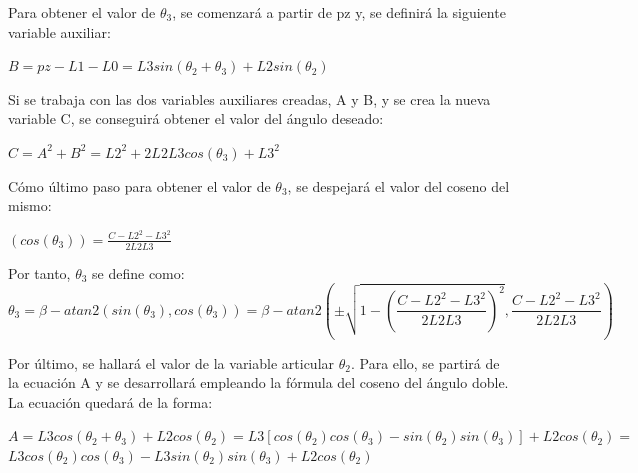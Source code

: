Para obtener el valor de $\theta_{3}$, se comenzará a partir de pz y, se definirá la siguiente variable auxiliar:\\

\begin{center}
	
	$ B=pz-L1-L0=L3sin(\theta_{2}+\theta_{3}) + L2sin(\theta_{2})$
	
\end{center}

Si se trabaja con las dos variables auxiliares creadas, A y B, y se crea la nueva variable C, se conseguirá obtener el valor del ángulo deseado:\\

\begin{center}
	
	$C= A^{2} + B^{2} = L2^{2}+ 2L2L3cos(\theta_{3}) + L3^{2} $
	
\end{center}



Cómo último paso para obtener el valor de $\theta_{3}$, se despejará el valor del coseno del mismo:\\

\begin{center}
	
	$ (cos(\theta_{3})) = \frac{C-L2^{2}-L3^{2}}{2L2L3} $
	
\end{center}

Por tanto, $\theta_{3}$ se define como:\\

\begin{equation}
\theta_{3}=\beta -atan2(sin(\theta_{3}),cos(\theta_{3}))=\beta-atan2(\pm \sqrt{1-(\frac{C-L2^{2}-L3^{2}}{2L2L3})^{2}},\frac{C-L2^{2}-L3^{2}}{2L2L3} )
\end{equation}



Por último, se hallará el valor de la variable articular $\theta_{2}$. Para ello, se partirá de la ecuación A y se desarrollará empleando la fórmula del coseno del ángulo doble. La ecuación quedará de la forma: \\

\begin{center}
	
	$A=L3cos(\theta_{2}+\theta_{3})+L2cos(\theta_{2})=L3[cos(\theta_{2})cos(\theta_{3})-sin(\theta_{2})sin(\theta_{3})]+L2cos(\theta_{2})=$\\ \vspace{0.3cm} $L3cos(\theta_{2})cos(\theta_{3})-L3sin(\theta_{2})sin(\theta_{3})+L2cos(\theta_{2})$
	
\end{center}

